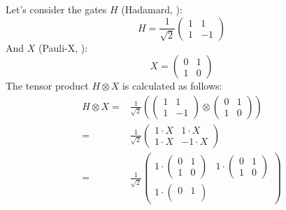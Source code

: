 \highspace
\begin{examplebox}[: $H \otimes X$]
    Let's consider the gates $H$ (Hadamard, ):
    \begin{equation*}
        H = \frac{1}{\sqrt{2}}
        \begin{pmatrix}
            1 & 1 \\
            1 & -1
        \end{pmatrix}
    \end{equation*}
    And $X$ (Pauli-X, ):
    \begin{equation*}
        X = \begin{pmatrix}
            0 & 1 \\
            1 & 0
        \end{pmatrix}
    \end{equation*}
    The tensor product $H \otimes X$ is calculated as follows:
    \begin{align*}
        H \otimes X =& \frac{1}{\sqrt{2}} \left(
            \begin{pmatrix}
                1 & 1 \\
                1 & -1
            \end{pmatrix}
            \otimes
            \begin{pmatrix}
                0 & 1 \\
                1 & 0
            \end{pmatrix}
        \right) \\
        =& \frac{1}{\sqrt{2}} \begin{pmatrix}
            1 \cdot X & 1 \cdot X \\
            1 \cdot X & -1 \cdot X
        \end{pmatrix} \\
        =& \frac{1}{\sqrt{2}} \begin{pmatrix}
            1 \cdot \begin{pmatrix}
                0 & 1 \\
                1 & 0
            \end{pmatrix} & 1 \cdot \begin{pmatrix}
                0 & 1 \\
                1 & 0
            \end{pmatrix} \\%
            1 \cdot \begin{pmatrix}
                0 & 1 \\

\end{pmatrix}
\end{pmatrix}
\end{align*}
\end{examplebox}
